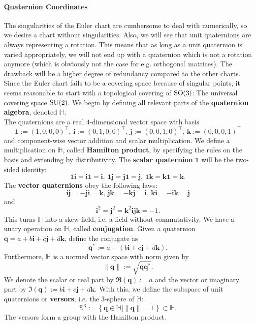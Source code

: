 \paragraph*{Quaternion Coordinates}
The singularities of the Euler chart are cumbersome to deal with numerically, so we desire a chart without singularities. Also, we will see that unit quaternions are always representing a rotation. This means that as long as a unit quaternion is varied appropriately, we will not end up with a quaternion which is not a rotation anymore (which is obviously not the case for e.g. orthogonal matrices). The drawback will be a higher degree of redundancy compared to the other charts.\\
Since the Euler chart fails to be a covering space because of singular points, it seems reasonable to start with a topological covering of $\operatorname{SO}(3)$: The universal covering space $\operatorname{SU}(2)$. We begin by defining all relevant parts of the \textbf{quaternion algebra}, denoted $\mathbb{H}$.\\
The quaternions are a real $4$-dimensional vector space with basis \[
    \bm{1}:=(1,0,0,0)^\top, \, \bm{i}:=(0,1,0,0)^\top, \, \bm{j}:=(0,0,1,0)^\top, \, \bm{k}:= (0,0,0,1)^\top
\] and component-wise vector addition and scalar multiplication. We define a multiplication on $\mathbb{H}$, called \textbf{Hamilton product}, by specifying the rules on the basis and extending by distributivity. The \textbf{scalar quaternion} $\bm{1}$ will be the two-sided identity:
\[
    \bm{1i}=\bm{i1}=\bm{i}, \, \bm{1j}=\bm{j1}=\bm{j}, \, \bm{1k}=\bm{k1}=\bm{k}
.\] 
The \textbf{vector quaternions} obey the following laws:
\[
    \bm{ij}=-\bm{ji}=\bm{k}, \, \bm{jk}=-\bm{kj}=\bm{i}, \, \bm{ki}=-\bm{ik}=\bm{j}
\] and \[
\bm{i}^2=\bm{j}^2=\bm{k}^2 \bm{ijk}=-1
.\] This turns $\mathbb{H}$ into a skew field, i.e. a field without commutativity. We have a unary operation on $\mathbb{H}$, called \textbf{conjugation}. Given a quaternion $\bm{q}=a+b\bm{i}+c\bm{j}+d\bm{k}$, define the conjugate as \[
\bm{q}^\ast := a - (b \bm{i}+c\bm{j}+d\bm{k})
.\] Furthermore, $\mathbb{H}$ is a normed vector space with norm given by \[
\|\bm{q}\|:=\sqrt{\bm{q}\bm{q}^\ast}
.\] We denote the scalar or real part by $\Re(\bm{q}):=a$ and the vector or imaginary part by $\Im(\bm{q}):=b\bm{i}+c\bm{j}+d\bm{k}$. With this, we define the subspace of unit quaternions or \textbf{versors}, i.e. the $3$-sphere of $\mathbb{H}$:
\[
    \mathbb{S}^3 := \left\{\bm{q} \in \mathbb{H} \mid \|\bm{q}\|=1 \right\} \subset \mathbb{H}
.\] The versors form a group with the Hamilton product. 
